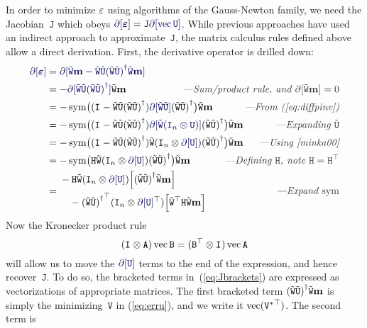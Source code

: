 \documentclass[runningheads]{llncs}
\def\eqref#1{(\ref{eq:#1})}
\def\eqlabel#1{\label{eq:#1}}
\def\tr{^\top}
\def\xcomment#1{\textcolor[gray]{.2}{\text{\em---#1}}}
\def\comment#1{\kern-1cm\xcomment{#1}}
\def\vec{\operatorname{vec}}
\def\m#1{\ensuremath{\mathtt{#1}}}
\def\v#1{\ensuremath{\mathbf{#1}}}
\def\mU{\m U}
\def\mV{\m V}
\def\mW{\m W}
\def\twiddle#1{{\tilde{#1}}}
\def\tU{\twiddle\mU}
\def\tW{\twiddle\mW}
\begin{document}
In order to minimize $\varepsilon$ using algorithms of the Gauss-Newton family, we need the Jacobian~$\m J$ which obeys $\diff[\verru] = \m J \diff[\vec\mU]$.  While previous approaches have used an indirect approach to approximate~\m J, the matrix calculus rules defined above allow a direct derivation.  First, the derivative operator is drilled down:
\def\awfhl#1{\Bigl[#1\Bigr]}
\begin{align}
\diff[\verru]& = \diff[ \tW \v m - \tW \tU \pinv{(\tW\tU)} \tW \v m ]
\\& = - \diff[\tW \tU \pinv{(\tW\tU)}]\tW \v m  & \kern-1in\comment{Sum/product rule, and $\partial[\tW\v m] = 0$}
\\& = - \sym\bigl((\Id{} - \tW \tU \pinv{(\tW\tU)})
                \diff[\tW \tU]
                \pinv{(\tW\tU)} \bigr) \tW \v m     & \comment{From \eqref{diffpinv}}
\\& = - \sym\bigl((\Id{} - \tW \tU \pinv{(\tW\tU)})
                \diff[\tW (\kron{\Id n}{\mU})]
                \pinv{(\tW\tU)} \bigr) \tW \v m      & \comment{Expanding $\tU$}
\\& = - \sym\bigl((\Id{} - \tW \tU \pinv{(\tW\tU)})
                \tW (\kron{\Id n}{\diff[\mU]})
                \pinv{(\tW\tU)} \bigr) \tW \v m    & \comment{Using \cite[(7)]{minka00}}
\\& = - \sym\bigl(\m H
                \tW (\kron{\Id n}{\diff[\mU]})
                \pinv{(\tW\tU)} \bigr) \tW \v m    & \comment{Defining $\m H$, note $\m H=\m H\tr$}
\\& = \begin{multlined}[c][5cm]
- \m H \tW (\kron{\Id n}{\diff[\mU]}) \awfhl{\pinv{(\tW\tU)} \tW \v m} \\
       - \pinv{(\tW\tU)}\tr (\kron{\Id n}{\diff[\mU]\tr}) \awfhl{\tW\tr \m H \tW \v m}
\end{multlined}
                                               & \comment{Expand $\sym$}
\eqlabel{Jbrackets}
\end{align}
Now the Kronecker product rule
\begin{equation}
(\kron{\Id{}}{\m A}) \vec \m B = (\kron{\m B \tr}{\Id{}}) \vec{\m A}
\eqlabel{kronvec}
\end{equation}
will allow us to move the $\diff[\mU]$ terms to the end of the expression, and hence recover~$\m J$.   To do so, the bracketed terms in~\eqref{Jbrackets} are expressed as vectorizations of appropriate matrices.
The first bracketed term $\pinv{(\tW\tU)} \tW \v m$ is simply the minimizing~$\mV$ in \eqref{erru}, and we write it $\vec(\Vstar\tr)$. The second term is
\end{document}

